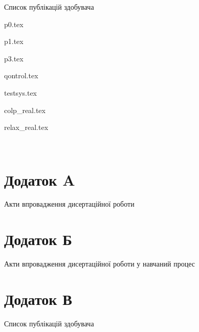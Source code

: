\documentclass[13pt,d,ukrlang]{vakthesisatu}
\author{\dissauthorFullRu}
\title{\bookname}
\date{\bookyear}
\begin{document}






\medskip

\begin{center}
Список публікацій здобувача
\end{center}



\clearpage
{}
{}
\tableofcontents




{p0.tex} %

{p1.tex} %


{p3.tex} %

{qontrol.tex} %

{testsys.tex} %

{colp_real.tex} %

{relax_real.tex} %






\clearpage
{}

\printbibliography[sorting=nty,title=СПИСОК ВИКОРИСТАНИХ ДЖЕРЕЛ]
\label{e:atu}{~}

\clearpage
{}
\chapter*{Додаток A}

\vspace{-7ex}
\begin{center}
Акти впровадження дисертаційної роботи
\end{center}


\clearpage
{}
\chapter*{Додаток Б}

\vspace{-7ex}
\begin{center}
Акти впровадження дисертаційної роботи у навчаний процес
\end{center}


\clearpage
{}
\chapter*{Додаток В}

\vspace{-7ex}
\begin{center}
  Список публікацій здобувача
\end{center}


\end{document}
